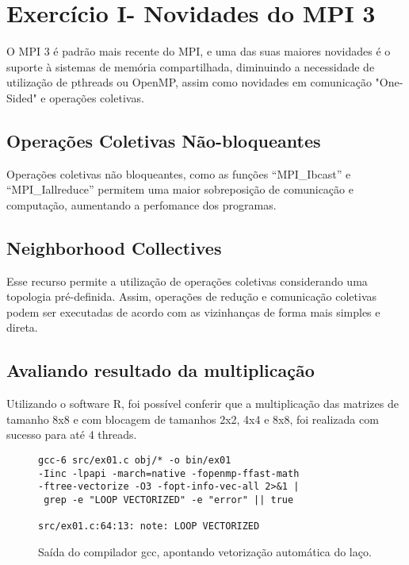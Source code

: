 \documentclass[conference]{IEEEtran}
\begin{document}
\begin{table}[htb!]

\section{Exercício I- Novidades do MPI 3}

O MPI 3 é padrão mais recente do MPI, e uma das suas maiores novidades é o suporte à sistemas de memória compartilhada, diminuindo a necessidade de utilização de pthreads ou OpenMP, assim como novidades em comunicação "One-Sided" e operações coletivas.

\subsection{Operações Coletivas Não-bloqueantes}
Operações coletivas não bloqueantes, como as funções ``MPI_Ibcast'' e ``MPI_Iallreduce'' permitem uma maior sobreposição de comunicação e computação, aumentando a perfomance dos programas.

\subsection{Neighborhood Collectives}
Esse recurso permite a utilização de operações coletivas considerando uma topologia pré-definida. Assim, operações de redução e comunicação coletivas podem ser executadas de acordo com as vizinhanças de forma mais simples e direta.

\subsection{Avaliando resultado da multiplicação}
Utilizando o software R, foi possível conferir que a multiplicação das matrizes de tamanho 8x8 e com blocagem de tamanhos 2x2, 4x4 e 8x8, foi realizada com sucesso para até 4 threads.

\begin{figure}[htb!]
\begin{adjustbox}{max width=\linewidth}
	\begin{BVerbatim}
gcc-6 src/ex01.c obj/* -o bin/ex01
-Iinc -lpapi -march=native -fopenmp-ffast-math
-ftree-vectorize -O3 -fopt-info-vec-all 2>&1 |
 grep -e "LOOP VECTORIZED" -e "error" || true

src/ex01.c:64:13: note: LOOP VECTORIZED
	\end{BVerbatim}
\end{adjustbox}
\caption{Saída do compilador gcc, apontando vetorização automática do laço.\label{fig:loop-vectorized}}
\end{figure}


\end{table}
\end{document}
